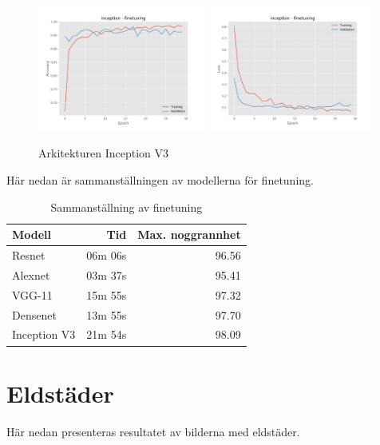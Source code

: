 \documentclass{kththesis}
\begin{document}
    \begin{figure}
      \centering
      \includegraphics[width=0.49\textwidth]{"./balcony/balcony-20split - acc - inception - finetuning"}
      \includegraphics[width=0.49\textwidth]{"./balcony/balcony-20split - loss - inception - finetuning"}
      \caption{Arkitekturen Inception V3}
    \end{figure}

    Här nedan är sammanställningen av modellerna för finetuning.

    \begin{table}
      \centering
      \begin{tabular}{|l|r|r|}
        Modell & Tid & Max. noggrannhet \\ 
        \hline
        Resnet       & 06m 06s & 96.56 \\
        Alexnet      & 03m 37s & 95.41 \\
        VGG-11       & 15m 55s & 97.32 \\
        Densenet     & 13m 55s & 97.70 \\
        Inception V3 & 21m 54s & 98.09 \\
      \end{tabular}
      \caption{Sammanställning av finetuning}
    \end{table}
  

  \section{Eldstäder}
  Här nedan presenteras resultatet av bilderna med eldstäder.
\end{document}
